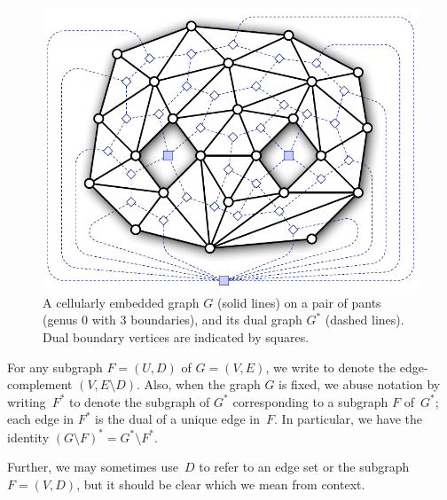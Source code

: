 \documentclass[11pt,twoside]{article}
\def\arcto{\mathord\shortrightarrow}
\begin{document}
\begin{figure}[htb]
\centering
\includegraphics[scale=0.45]{Fig/pants}
\caption{A cellularly embedded graph $G$ (solid lines) on a pair of pants (genus 0 with 3 boundaries), and its dual graph $G^*$ (dashed lines).  Dual boundary vertices are indicated by squares.}
\label{fig:duality}
\end{figure}

For any subgraph $F = (U,D)$ of $G = (V,E)$, we write  to denote the edge-complement $(V, E\setminus D)$.  Also, when the graph $G$ is fixed, we abuse notation by writing~$F^*$ to denote the subgraph of $G^*$ corresponding to a subgraph $F$ of~$G^*$; each edge in $F^*$ is the dual of a unique edge in~$F$.  In particular, we have the identity $(G\setminus F)^* = G^* \setminus F^*$.

Further, we may sometimes use~$D$ to refer to an edge set or the subgraph~$F = (V, D)$,
but it should be clear which we mean from context.


\end{document}
